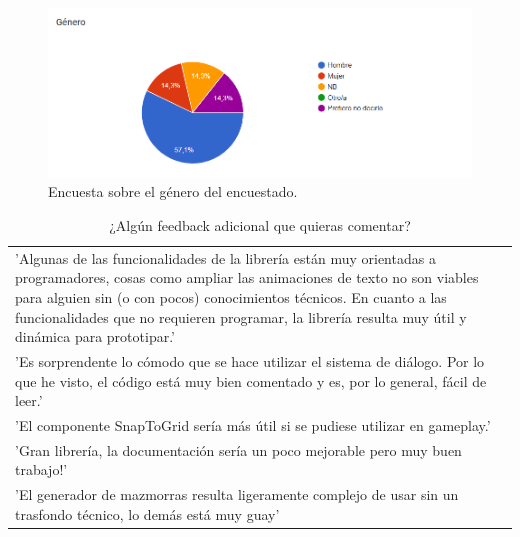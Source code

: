 \begin{figure}[H]
  \centering
  \includegraphics[width=450px,clip=true]{CUESTIONARIO_33.png}
  \caption{Encuesta sobre el género del encuestado.}
  \label{fig:CUESTIONARIO_33}
\end{figure}
\raggedbottom


\begin{table}[H]
  \begin{center}
  \setlength{\tabcolsep}{5pt}
  \renewcommand{\arraystretch}{1.2}
  \begin{tabular}{ | m{\textwidth} | } 
    \hline
    'Algunas de las funcionalidades de la librería están muy orientadas a programadores, cosas como ampliar las animaciones de texto no son viables para alguien sin (o con pocos) conocimientos técnicos. En cuanto a las funcionalidades que no 
    requieren programar, la librería resulta muy útil y dinámica para prototipar.' \\ 

    'Es sorprendente lo cómodo que se hace utilizar el sistema de diálogo. Por lo que he visto, el código está muy bien comentado y es, por lo general, fácil de leer.' \\ 

    'El componente SnapToGrid sería más útil si se pudiese utilizar en gameplay.' \\ 

    'Gran librería, la documentación sería un poco mejorable pero muy buen trabajo!' \\ 

    'El generador de mazmorras resulta ligeramente complejo de usar sin un trasfondo técnico, lo demás está muy guay' \\ 
    \hline
  \end{tabular}
  \centering
  \caption{¿Algún feedback adicional que quieras comentar?}
  \label{fig:tablaFeedback}
  \end{center}
\end{table}  


